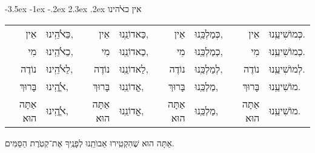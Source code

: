 \documentclass[12pt,letterpaper]{siddur}
\makeatletter
\renewcommand\section{\setcounter{mishnah}{0}\@startsection {section}{1}{\z@}%
                                   {-3.5ex \@plus -1ex \@minus -.2ex}%
                                   {2.3ex \@plus.2ex}%
                                   {\normalfont\large}}
\makeatother
\begin{document}
\pagestyle{plain}
\section{אין כﭏהינו}
\begin{longtable}[r]{r l r l r l r l}
אֵין&כֵּﭏֺהֵֽינוּ,&אֵין&כַּאדוֹנֵֽנוּ,&אֵין&כְּמַלְכֵּֽנוּ,&אֵין&כְּמוֹשִׁיעֵֽנוּ.\\
מִי&כֵﭏֺהֵֽינוּ,&מִי&כַאדוֹנֵֽנוּ,&מִי&כְמַלְכֵּֽנוּ,&מִי&כְמוֹשִׁיעֵֽנוּ.\\
נוֹדֶה&לֵﭏֺהֵֽינוּ,&נוֹדֶה&לַאדוֹנֵֽנוּ,&נוֹדֶה&לְמַלְכֵּֽנוּ,&נוֹדֶה&לְמוֹשִׁיעֵֽנוּ.\\
בָּרוּךְ&ﭏֱֺהֵֽינוּ,&בָּרוּךְ&אֲדוֹנֵֽנוּ,&בָּרוּךְ&מַלְכֵּֽנוּ,&בָּרוּךְ&מוֹשִׁיעֵֽנוּ.\\
אַתָּה הוּא&ﭏֱֺהֵֽינוּ,&אַתָּה הוּא&אֲדוֹנֵֽנוּ,&אַתָּה הוּא&מַלְכֵּֽנוּ,&אַתָּה הוּא&מוֹשִׁיעֵֽנוּ.
\end{longtable}\noindent
אַתָּה הוּא שֶׁהִקְטִֽירוּ אַבוֺתֵֽנוּ לְפָנֶֽיךָ אֶת־קְטֹֽרֶת הַסַּמִּים.
\end{document}
